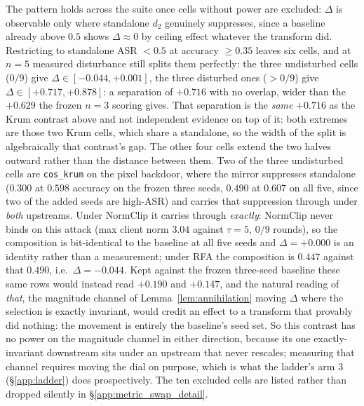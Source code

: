 \documentclass{article}
\begin{document}
The pattern holds across the suite once cells without power are excluded: $\Delta$ is observable only where standalone $d_2$ genuinely suppresses, since a baseline already above $0.5$ shows $\Delta \approx 0$ by ceiling effect whatever the transform did. Restricting to standalone ASR $< 0.5$ at accuracy $\ge 0.35$ leaves six cells, and at $n{=}5$ measured disturbance still splits them perfectly: the three undisturbed cells ($0/9$) give $\Delta \in [-0.044, +0.001]$, the three disturbed ones ($>0/9$) give $\Delta \in [+0.717, +0.878]$: a separation of $+0.716$ with no overlap, wider than the $+0.629$ the frozen $n{=}3$ scoring gives. That separation is the \emph{same} $+0.716$ as the Krum contrast above and not independent evidence on top of it: both extremes are those two Krum cells, which share a standalone, so the width of the split is algebraically that contrast's gap. The other four cells extend the two halves outward rather than the distance between them. Two of the three undisturbed cells are \texttt{cos\_krum} on the pixel backdoor, where the mirror suppresses standalone ($0.300$ at $0.598$ accuracy on the frozen three seeds, $0.490$ at $0.607$ on all five, since two of the added seeds are high-ASR) and carries that suppression through under \emph{both} upstreams. Under NormClip it carries through \emph{exactly}: NormClip never binds on this attack (max client norm $3.04$ against $\tau = 5$, $0/9$ rounds), so the composition is bit-identical to the baseline at all five seeds and $\Delta = +0.000$ is an identity rather than a measurement; under RFA the composition is $0.447$ against that $0.490$, i.e.\ $\Delta = -0.044$. Kept against the frozen three-seed baseline these same rows would instead read $+0.190$ and $+0.147$, and the natural reading of \emph{that}, the magnitude channel of Lemma~\ref{lem:annihilation} moving $\Delta$ where the selection is exactly invariant, would credit an effect to a transform that provably did nothing: the movement is entirely the baseline's seed set. So this contrast has no power on the magnitude channel in either direction, because its one exactly-invariant downstream sits under an upstream that never rescales; measuring that channel requires moving the dial on purpose, which is what the ladder's arm 3 (§\ref{app:ladder}) does prospectively. The ten excluded cells are listed rather than dropped silently in §\ref{app:metric_swap_detail}.
\end{document}
